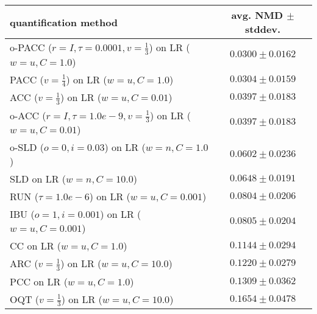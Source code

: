 \begin{tabular}{lc}
  \toprule
  quantification method & avg. NMD $\pm$ stddev. \\
  \midrule
  o-PACC ($r=I, \tau=0.0001, v=\frac{1}{3}$) on LR ($w=u, C=1.0$) & $\mathbf{0.0300 \pm 0.0162}$ \\
  PACC ($v=\frac{1}{4}$) on LR ($w=u, C=1.0$) & $\mathbf{0.0304 \pm 0.0159}$ \\
  ACC ($v=\frac{1}{3}$) on LR ($w=u, C=0.01$) & $0.0397 \pm 0.0183$ \\
  o-ACC ($r=I, \tau=1.0e-9, v=\frac{1}{3}$) on LR ($w=u, C=0.01$) & $0.0397 \pm 0.0183$ \\
  o-SLD ($o=0, i=0.03$) on LR ($w=n, C=1.0$) & $0.0602 \pm 0.0236$ \\
  SLD on LR ($w=n, C=10.0$) & $0.0648 \pm 0.0191$ \\
  RUN ($\tau=1.0e-6$) on LR ($w=u, C=0.001$) & $0.0804 \pm 0.0206$ \\
  IBU ($o=1, i=0.001$) on LR ($w=u, C=0.001$) & $0.0805 \pm 0.0204$ \\
  CC on LR ($w=u, C=1.0$) & $0.1144 \pm 0.0294$ \\
  ARC ($v=\frac{1}{3}$) on LR ($w=u, C=10.0$) & $0.1220 \pm 0.0279$ \\
  PCC on LR ($w=u, C=1.0$) & $0.1309 \pm 0.0362$ \\
  OQT ($v=\frac{1}{3}$) on LR ($w=u, C=10.0$) & $0.1654 \pm 0.0478$ \\
  \bottomrule
\end{tabular}

